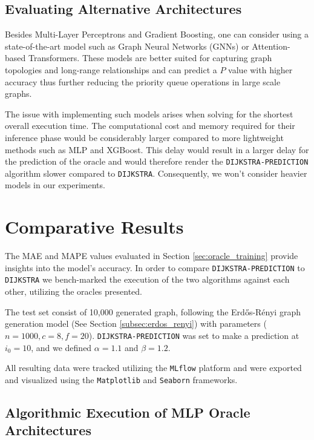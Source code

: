 \subsection{Evaluating Alternative Architectures}
\label{subsec:alternative_architectures}

Besides Multi-Layer Perceptrons and Gradient Boosting, one can consider using a state-of-the-art model such as Graph Neural Networks (GNNs)\cite{scarselliTheGraphNeuralNetworkModel2009} or Attention-based Transformers\cite{vaswaniAttentionAllYou2023}. These models are better suited for capturing graph topologies and long-range relationships and can predict a $P$ value with higher accuracy thus further reducing the priority queue operations in large scale graphs.

The issue with implementing such models arises when solving for the shortest overall execution time. The computational cost and memory required for their inference phase would be considerably larger compared to more lightweight methods such as MLP and XGBoost. This delay would result in a larger delay for the prediction of the oracle and would therefore render the \texttt{DIJKSTRA-PREDICTION} algorithm slower compared to \texttt{DIJKSTRA}. Consequently, we won't consider heavier models in our experiments.

\section{Comparative Results}
\label{sec:results}

The MAE and MAPE values evaluated in Section \ref{sec:oracle_training} provide insights into the model's accuracy. In order to compare \texttt{DIJKSTRA-PREDICTION} to \texttt{DIJKSTRA} we bench-marked the execution of the two algorithms against each other, utilizing the oracles presented. 

The test set consist of 10,000 generated graph, following the Erdős-Rényi graph generation model (See Section \ref{subsec:erdos_renyi}) with parameters ($n=1000, c=8, f=20$). \texttt{DIJKSTRA-PREDICTION} was set to make a prediction at $i_0 = 10$, and we defined $\alpha = 1.1$ and $\beta = 1.2$.

All resulting data were tracked utilizing the \texttt{MLflow} platform and were exported and visualized using the \texttt{Matplotlib} and \texttt{Seaborn} frameworks. 
\newpage

\subsection{Algorithmic Execution of MLP Oracle Architectures}
\label{subsec:mlp_benchmark}

